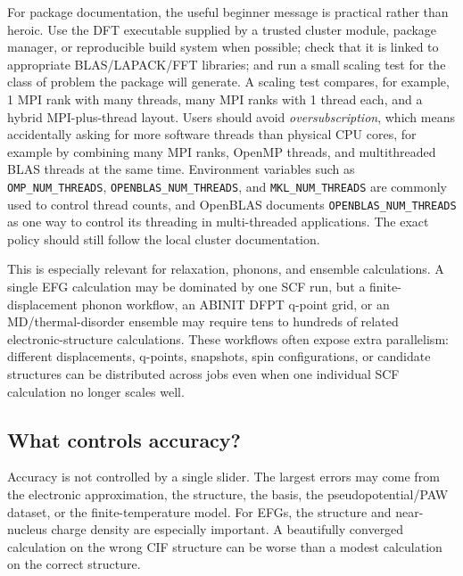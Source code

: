 \documentclass[11pt]{article}
\begin{document}
For package documentation, the useful beginner message is practical rather than heroic.  Use the DFT executable supplied by a trusted cluster module, package manager, or reproducible build system when possible; check that it is linked to appropriate BLAS/LAPACK/FFT libraries; and run a small scaling test for the class of problem the package will generate.  A scaling test compares, for example, 1 MPI rank with many threads, many MPI ranks with 1 thread each, and a hybrid MPI-plus-thread layout.  Users should avoid \emph{oversubscription}, which means accidentally asking for more software threads than physical CPU cores, for example by combining many MPI ranks, OpenMP threads, and multithreaded BLAS threads at the same time.  Environment variables such as \texttt{OMP\_NUM\_THREADS}, \texttt{OPENBLAS\_NUM\_THREADS}, and \texttt{MKL\_NUM\_THREADS} are commonly used to control thread counts, and OpenBLAS documents \texttt{OPENBLAS\_NUM\_THREADS} as one way to control its threading in multi-threaded applications.\cite{OpenBLAS}  The exact policy should still follow the local cluster documentation.

This is especially relevant for relaxation, phonons, and ensemble calculations.  A single EFG calculation may be dominated by one SCF run, but a finite-displacement phonon workflow, an ABINIT DFPT q-point grid, or an MD/thermal-disorder ensemble may require tens to hundreds of related electronic-structure calculations.  These workflows often expose extra parallelism: different displacements, q-points, snapshots, spin configurations, or candidate structures can be distributed across jobs even when one individual SCF calculation no longer scales well.

\subsection{What controls accuracy?}

Accuracy is not controlled by a single slider.  The largest errors may come from the electronic approximation, the structure, the basis, the pseudopotential/PAW dataset, or the finite-temperature model.  For EFGs, the structure and near-nucleus charge density are especially important.  A beautifully converged calculation on the wrong CIF structure can be worse than a modest calculation on the correct structure.
\end{document}
